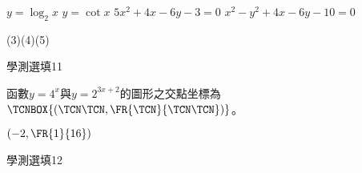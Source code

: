 \begin{QUESTIONS}
\begin{QUESTION}
\begin{QBODY}
\begin{QOPS}
            \QOP $y={{\log }_{2}}x$
            \QOP $y=\cot x$
            \QOP $5{{x}^{2}}+4x-6y-3=0$
            \QOP ${{x}^{2}}-{{y}^{2}}+4x-6y-10=0$ 
        \end{QOPS}        
        \end{QBODY}
        \begin{QFROMS}
        \end{QFROMS}
        \begin{QTAGS}\end{QTAGS}
        \begin{QANS}
            (3)(4)(5)
        \end{QANS}
        \begin{QSOLLIST}
        \end{QSOLLIST}
        \begin{QEMPTYSPACE}
        \end{QEMPTYSPACE}
    \end{QUESTION}
\end{QUESTIONS}\begin{QUESTIONS}
    \begin{QUESTION}
        \begin{ExamInfo}{83}{學測}{選填}{11}
        \end{ExamInfo}
        \begin{ExamAnsRateInfo}{}{}{}{}
        \end{ExamAnsRateInfo}
        \begin{QBODY}
            函數$y={{4}^{x}}$與$y={{2}^{3x+2}}$的圖形之交點坐標為 $\TCNBOX{(\TCN\TCN,\FR{\TCN}{\TCN\TCN})}$。
        \end{QBODY}
        \begin{QFROMS}
        \end{QFROMS}
        \begin{QTAGS}\end{QTAGS}
        \begin{QANS}
            $(-2, \FR{1}{16})$
        \end{QANS}
        \begin{QSOLLIST}
        \end{QSOLLIST}
        \begin{QEMPTYSPACE}
        \end{QEMPTYSPACE}
    \end{QUESTION}
    \begin{QUESTION}
        \begin{ExamInfo}{83}{學測}{選填}{12}
        \end{ExamInfo}

\end{QUESTION}
\end{QUESTIONS}
